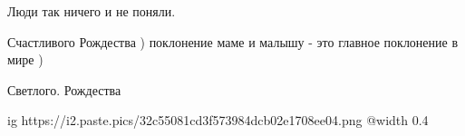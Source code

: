 \begin{multicols}{2}
Люди так ничего и не поняли.

Счастливого Рождества ) поклонение маме и малышу - это главное поклонение в мире )


Светлого. Рождества


\ifcmt
  ig https://i2.paste.pics/32c55081cd3f573984dcb02e1708ee04.png
  @width 0.4
\fi

\end{multicols} %
